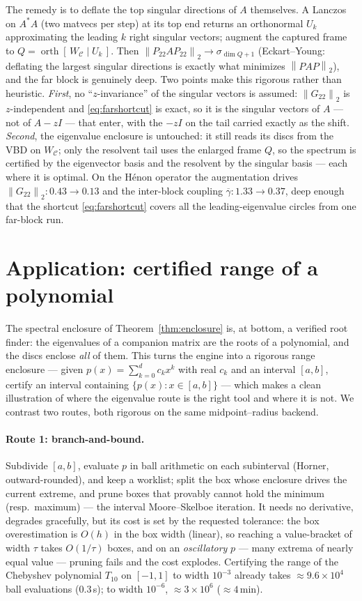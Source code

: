 \documentclass[11pt,a4paper]{article}
\newcommand{\norm}[1]{\left\|#1\right\|}
\theoremstyle{plain}
\theoremstyle{definition}
\begin{document}
The remedy is to deflate the top singular directions of $A$ themselves. A Lanczos on $A^{*}A$
(two matvecs per step) at its top end returns an orthonormal $U_k$ approximating the leading $k$
right singular vectors; augment the captured frame to
$Q=\operatorname{orth}[\,W_{\mathcal C}\mid U_k\,]$. Then $\norm{P_{22}AP_{22}}_2\to\sigma_{\dim Q+1}$
(Eckart--Young: deflating the largest singular directions is exactly what minimizes $\norm{PAP}_2$),
and the far block is genuinely deep. Two points make this rigorous rather than heuristic.
\emph{First}, no ``$z$-invariance'' of the singular vectors is assumed: $\norm{G_{22}}_2$ is
$z$-independent and \eqref{eq:farshortcut} is exact, so it is the singular vectors of $A$ --- not of
$A-zI$ --- that enter, with the $-zI$ on the tail carried exactly as the shift. \emph{Second}, the
eigenvalue enclosure is untouched: it still reads its discs from the VBD on $W_{\mathcal C}$; only the
resolvent tail uses the enlarged frame $Q$, so the spectrum is certified by the eigenvector basis
and the resolvent by the singular basis --- each where it is optimal. On the H\'enon operator the
augmentation drives $\norm{G_{22}}_2:0.43\to0.13$ and the inter-block coupling
$\overline\gamma:1.33\to0.37$, deep enough that the shortcut \eqref{eq:farshortcut} covers all the
leading-eigenvalue circles from one far-block run.

\section{Application: certified range of a polynomial}\label{sec:polyrange}

The spectral enclosure of Theorem~\ref{thm:enclosure} is, at bottom, a verified root
finder: the eigenvalues of a companion matrix are the roots of a polynomial, and the discs
enclose \emph{all} of them. This turns the engine into a rigorous range enclosure --- given
$p(x)=\sum_{k=0}^d c_k x^k$ with real $c_k$ and an interval $[a,b]$, certify an interval
containing $\{p(x):x\in[a,b]\}$ --- which makes a clean illustration of where the
eigenvalue route is the right tool and where it is not. We contrast two routes, both
rigorous on the same midpoint--radius backend.

\paragraph{Route 1: branch-and-bound.} Subdivide $[a,b]$, evaluate $p$ in ball arithmetic
on each subinterval (Horner, outward-rounded), and keep a worklist; split the box whose
enclosure drives the current extreme, and prune boxes that provably cannot hold the
minimum (resp.\ maximum) --- the interval Moore--Skelboe iteration. It needs no derivative,
degrades gracefully, but its cost is set by the requested tolerance: the box overestimation
is $O(h)$ in the box width (linear), so reaching a value-bracket of width $\tau$ takes
$O(1/\tau)$ boxes, and on an \emph{oscillatory} $p$ --- many extrema of nearly equal value
--- pruning fails and the cost explodes. Certifying the range of the Chebyshev polynomial
$T_{10}$ on $[-1,1]$ to width $10^{-3}$ already takes $\approx 9.6\times10^{4}$ ball
evaluations ($0.3$\,s); to width $10^{-6}$, $\approx 3\times10^{6}$ ($\approx 4$\,min).
\end{document}
